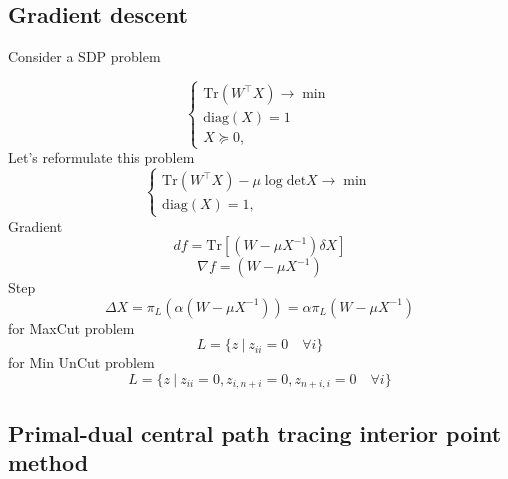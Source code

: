 \documentclass[12pt]{article}
\begin{document}
\subsection{Gradient descent}

Consider a SDP problem

\begin{equation}
\label{primal}
\begin{cases}
\text{Tr} \left( W^{\top}
X \right) \longrightarrow \min \\
\text{diag} \left( X \right) = 1\\
X \succeq 0,
\end{cases}
\end{equation}
Let's reformulate this problem
\begin{equation}
\label{primal}
\begin{cases}
\text{Tr} \left( W^{\top} X \right) - \mu \log \text{det} X \longrightarrow \min \\
\text{diag} \left( X \right) = 1,
\end{cases}
\end{equation}
Gradient
\[
df = \text{Tr} \left[ (W - \mu X^{-1}) \delta X\right]
\]
\[
\nabla f = (W - \mu X^{-1})
\]
Step
\[
\Delta X = \pi_L \left( \alpha (W - \mu X^{-1})\right) = \alpha \pi_L \left( W - \mu X^{-1}\right)
\]
for MaxCut problem 
\[L = \{z \ | \ z_{ii} = 0 \quad \forall i\}\]
for Min UnCut problem \[L = \{z \ | \ z_{ii} = 0, z_{i,n+i} = 0, z_{n+i, i} = 0 \quad \forall i\}\]


\subsection{Primal-dual central path tracing interior point method}
\end{document}
